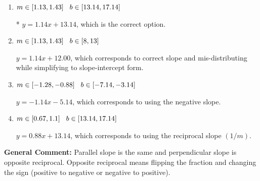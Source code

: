 \documentclass{extbook}[14pt]
\begin{document}
\begin{enumerate}
{\begin{enumerate}[label=\Alph*.]
 $y = 1.14x - 13.14$, which corresponds to using the correct slope and getting the negative $y$-intercept.
\item \( m \in [1.13, 1.43] \hspace*{3mm} b \in [13.14, 17.14] \)

* $y = 1.14x + 13.14$, which is the correct option.
\item \( m \in [1.13, 1.43] \hspace*{3mm} b \in [8, 13] \)

 $y = 1.14x + 12.00$, which corresponds to correct slope and mis-distributing while simplifying to slope-intercept form.
\item \( m \in [-1.28, -0.88] \hspace*{3mm} b \in [-7.14, -3.14] \)

 $y = -1.14x - 5.14$, which corresponds to using the negative slope.
\item \( m \in [0.67, 1.1] \hspace*{3mm} b \in [13.14, 17.14] \)

 $y = 0.88x + 13.14$, which corresponds to using the reciprocal slope $(1/m)$.
\end{enumerate}

\textbf{General Comment:} Parallel slope is the same and perpendicular slope is opposite reciprocal. Opposite reciprocal means flipping the fraction and changing the sign (positive to negative or negative to positive).
}
\end{enumerate}
\end{document}
